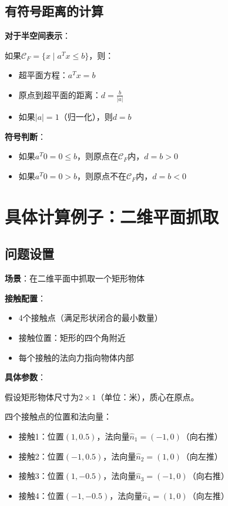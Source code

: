 \documentclass[12pt,a4paper]{article}
\begin{document}
\subsection{有符号距离的计算}

\textbf{对于半空间表示}：

如果$\mathcal{C}_F = \{x \mid a^T x \leq b\}$，则：
\begin{itemize}
\item 超平面方程：$a^T x = b$
\item 原点到超平面的距离：$d = \frac{b}{|a|}$
\item 如果$|a| = 1$（归一化），则$d = b$
\end{itemize}

\textbf{符号判断}：
\begin{itemize}
\item 如果$a^T 0 = 0 \leq b$，则原点在$\mathcal{C}_F$内，$d = b > 0$
\item 如果$a^T 0 = 0 > b$，则原点不在$\mathcal{C}_F$内，$d = b < 0$
\end{itemize}

\section{具体计算例子：二维平面抓取}

\subsection{问题设置}

\textbf{场景}：在二维平面中抓取一个矩形物体

\textbf{接触配置}：
\begin{itemize}
\item 4个接触点（满足形状闭合的最小数量）
\item 接触位置：矩形的四个角附近
\item 每个接触的法向力指向物体内部
\end{itemize}

\textbf{具体参数}：

假设矩形物体尺寸为$2 \times 1$（单位：米），质心在原点。

四个接触点的位置和法向量：
\begin{itemize}
\item 接触1：位置$(1, 0.5)$，法向量$\hat{n}_1 = (-1, 0)$（向右推）
\item 接触2：位置$(-1, 0.5)$，法向量$\hat{n}_2 = (1, 0)$（向左推）
\item 接触3：位置$(1, -0.5)$，法向量$\hat{n}_3 = (-1, 0)$（向右推）
\item 接触4：位置$(-1, -0.5)$，法向量$\hat{n}_4 = (1, 0)$（向左推）
\end{itemize}
\end{document}
